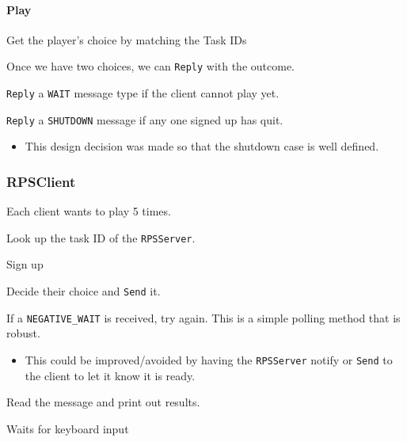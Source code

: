 \documentclass[letterpaper]{article}
\begin{document}
\paragraph{Play%
  \label{play}%
}
\setcounter{listcnt0}{0}
\begin{list}{.}
{
\setlength{\rightmargin}{\leftmargin}
}

\item Get the player's choice by matching the Task IDs

\item Once we have two choices, we can \texttt{Reply} with the outcome.

\item \texttt{Reply} a \texttt{WAIT} message type if the client cannot play yet.

\item \texttt{Reply} a \texttt{SHUTDOWN} message if any one signed up has quit.
%
\begin{itemize}

\item This design decision was made so that the shutdown case is well defined.

\end{itemize}
\end{list}


\subsubsection{RPSClient%
  \label{rpsclient}%
}

Each client wants to play 5 times.
\setcounter{listcnt0}{0}
\begin{list}{.}
{
\setlength{\rightmargin}{\leftmargin}
}

\item Look up the task ID of the \texttt{RPSServer}.

\item Sign up

\item Decide their choice and \texttt{Send} it.

\item If a \texttt{NEGATIVE\_WAIT} is received, try again. This is a simple polling method that is robust.
%
\begin{itemize}

\item This could be improved/avoided by having the \texttt{RPSServer} notify or \texttt{Send} to the client to let it know it is ready.

\end{itemize}

\item Read the message and print out results.

\item Waits for keyboard input
\end{list}
\end{document}
